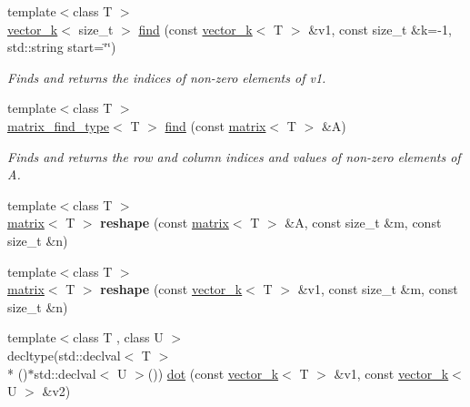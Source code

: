 \begin{DoxyCompactItemize}
\item 
\hypertarget{namespacekeycpp_afbcf6804c0bcef12904db8880c451cea}{{\footnotesize template$<$class T $>$ }\\\hyperlink{classkeycpp_1_1vector__k}{vector\-\_\-k}$<$ size\-\_\-t $>$ \hyperlink{namespacekeycpp_afbcf6804c0bcef12904db8880c451cea}{find} (const \hyperlink{classkeycpp_1_1vector__k}{vector\-\_\-k}$<$ T $>$ \&v1, const size\-\_\-t \&k=-\/1, std\-::string start=\char`\"{}\char`\"{})}\label{namespacekeycpp_afbcf6804c0bcef12904db8880c451cea}

\begin{DoxyCompactList}\small\item\em Finds and returns the indices of non-\/zero elements of v1. \end{DoxyCompactList}\item 
\hypertarget{namespacekeycpp_a97f0fc27cf8489f3f556fb1a0c975115}{{\footnotesize template$<$class T $>$ }\\\hyperlink{structkeycpp_1_1matrix__find__type}{matrix\-\_\-find\-\_\-type}$<$ T $>$ \hyperlink{namespacekeycpp_a97f0fc27cf8489f3f556fb1a0c975115}{find} (const \hyperlink{classkeycpp_1_1matrix}{matrix}$<$ T $>$ \&A)}\label{namespacekeycpp_a97f0fc27cf8489f3f556fb1a0c975115}

\begin{DoxyCompactList}\small\item\em Finds and returns the row and column indices and values of non-\/zero elements of A. \end{DoxyCompactList}\item 
\hypertarget{namespacekeycpp_a8e6462a878df6e022bd4f9aa6f953983}{{\footnotesize template$<$class T $>$ }\\\hyperlink{classkeycpp_1_1matrix}{matrix}$<$ T $>$ {\bfseries reshape} (const \hyperlink{classkeycpp_1_1matrix}{matrix}$<$ T $>$ \&A, const size\-\_\-t \&m, const size\-\_\-t \&n)}\label{namespacekeycpp_a8e6462a878df6e022bd4f9aa6f953983}

\item 
\hypertarget{namespacekeycpp_a1e3e21956e9f34310b243bc45d68b238}{{\footnotesize template$<$class T $>$ }\\\hyperlink{classkeycpp_1_1matrix}{matrix}$<$ T $>$ {\bfseries reshape} (const \hyperlink{classkeycpp_1_1vector__k}{vector\-\_\-k}$<$ T $>$ \&v1, const size\-\_\-t \&m, const size\-\_\-t \&n)}\label{namespacekeycpp_a1e3e21956e9f34310b243bc45d68b238}

\item 
\hypertarget{namespacekeycpp_a04dabe064e99dd423157829c4b133261}{{\footnotesize template$<$class T , class U $>$ }\\decltype(std\-::declval$<$ T $>$\\*
()$\ast$std\-::declval$<$ U $>$()) \hyperlink{namespacekeycpp_a04dabe064e99dd423157829c4b133261}{dot} (const \hyperlink{classkeycpp_1_1vector__k}{vector\-\_\-k}$<$ T $>$ \&v1, const \hyperlink{classkeycpp_1_1vector__k}{vector\-\_\-k}$<$ U $>$ \&v2)}\label{namespacekeycpp_a04dabe064e99dd423157829c4b133261}


\end{DoxyCompactItemize}
